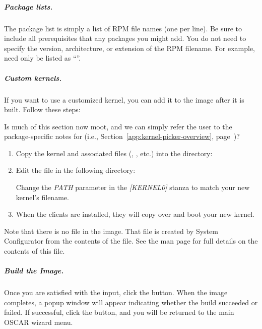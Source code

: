 \subparagraph{Package lists.}

The package list is simply a list of RPM file names (one per line). Be
sure to include all prerequisites that any packages you might add.
You do not need to specify the version, architecture, or extension of
the RPM filename.  For example,  need only
be listed as ``''.

\subparagraph{Custom kernels.}

If you want to use a customized kernel, you can add it to the image
after it is built. Follow these steps:

\begin{discuss}
  Is much of this section now moot, and we can simply refer the user
  to the package-specific notes for  (i.e.,
  Section~\ref{app:kernel-picker-overview},
  page~\pageref{app:kernel-picker-overview})?
\end{discuss}

\begin{enumerate}
\item Copy the kernel and associated files (,
  , etc.) into the directory:

  \vspace{11pt}
  \centerline{}

\item Edit the  file in the following
  directory:

  \vspace{11pt}
  \centerline{}
  \vspace{11pt}
  
  Change the \emph{PATH} parameter in the \emph{[KERNEL0]} stanza to
  match your new kernel's filename.

\item When the clients are installed, they will copy over and boot
  your new kernel.
\end{enumerate}

Note that there is no  file in the image. That file is
created by System Configurator from the contents of the
 file. See the 
man page for full details on the contents of this file.

\subparagraph{Build the Image.}

Once you are satisfied with the input, click the 
button.  When the image completes, a popup window will appear
indicating whether the build succeeded or failed.  If successful,
click the  button, and you will be returned to the main
OSCAR wizard menu.

